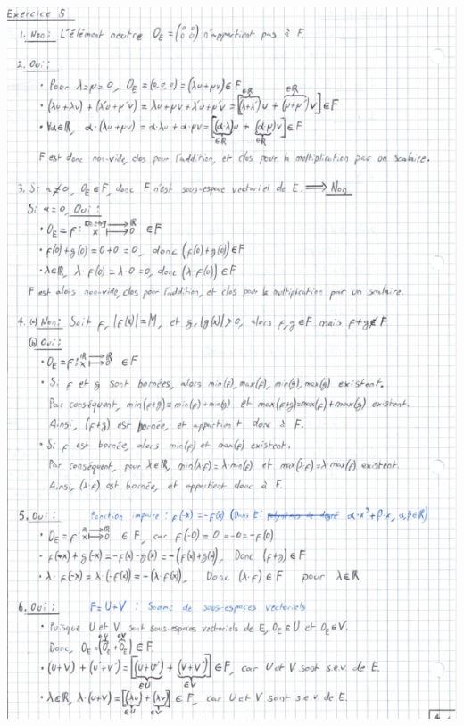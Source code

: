 \documentclass[a4paper, 10pt]{report}
\begin{document}
	
	\includegraphics{ex05.png}
	
\end{document}
